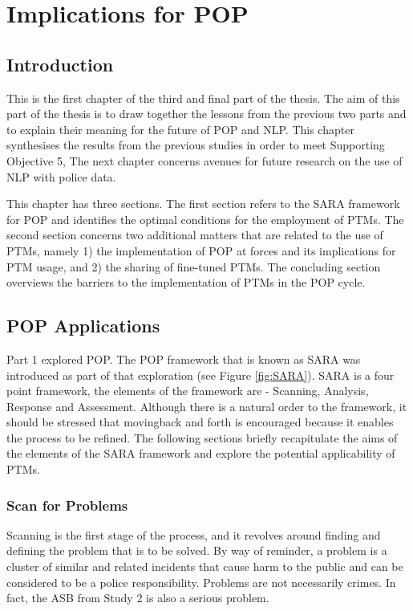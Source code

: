 \chapter{Implications for POP}


\section{Introduction} This is the first chapter of the third and final part of the thesis. The aim of this part of the thesis is to draw together the lessons from the previous two parts and to explain their meaning for the future of POP and NLP. This chapter synthesises the results from the previous studies in order to meet Supporting Objective 5,   The next chapter concerns avenues for future research on the use of NLP with police data.

This chapter has three sections. The first section refers to the SARA framework for POP and identifies the optimal conditions for the employment of PTMs. The second section concerns two additional matters that are related to the use of PTMs, namely 1) the implementation of POP at forces and its implications for PTM usage, and 2) the sharing of fine-tuned PTMs. The concluding section overviews the barriers to the implementation of PTMs in the POP cycle.


\section{POP Applications} Part 1 explored POP. The POP framework that is known as SARA was introduced as part of that exploration (see Figure \ref{fig:SARA}). SARA is a four point framework, the elements of the framework are - Scanning, Analysis, Response and Assessment.  Although there is a natural order to the framework, it should be stressed that movingback and forth is encouraged because it enables the process to be refined. The following sections briefly recapitulate the aims of the elements of the SARA framework and explore the potential applicability of PTMs.

\subsection{Scan for Problems} Scanning is the first stage of the process, and it revolves around finding and defining the problem that is to be solved. By way of reminder, a problem is a cluster of similar and related incidents that cause harm to the public and can be considered to be a police responsibility. Problems are not necessarily crimes. In fact, the ASB from Study 2 is also a serious problem. 

